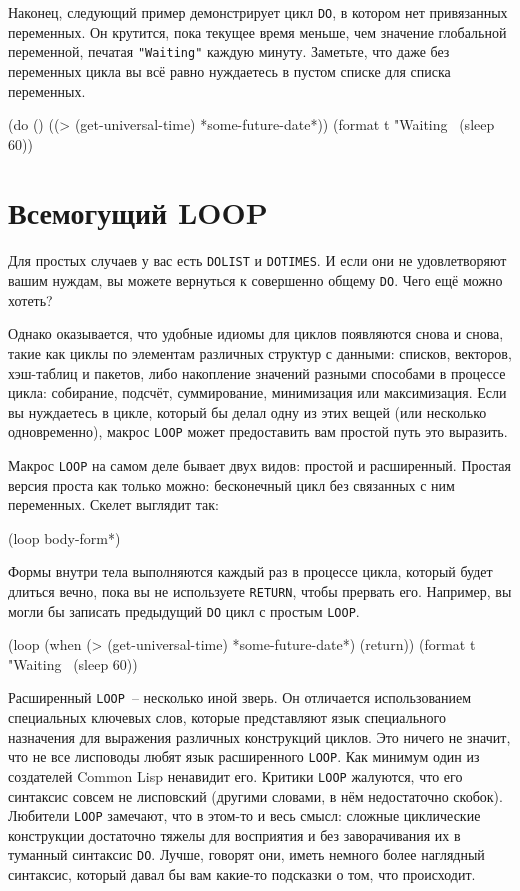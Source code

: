 Наконец, следующий пример демонстрирует цикл \lstinline{DO}, в котором нет привязанных
переменных. Он крутится, пока текущее время меньше, чем значение глобальной переменной,
печатая \lstinline{"Waiting"} каждую минуту. Заметьте, что даже без переменных цикла вы всё равно
нуждаетесь в пустом списке для списка переменных.

\begin{myverb}
(do ()
    ((> (get-universal-time) *some-future-date*))
  (format t "Waiting~%
  (sleep 60)) 
\end{myverb}

\section{Всемогущий LOOP}

Для простых случаев у вас есть \lstinline{DOLIST} и \lstinline{DOTIMES}. И если они не удовлетворяют
вашим нуждам, вы можете вернуться к совершенно общему \lstinline{DO}. Чего ещё можно хотеть?

Однако оказывается, что удобные идиомы для циклов появляются снова и снова, такие как
циклы по элементам различных структур с данными: списков, векторов, хэш-таблиц и пакетов,
либо накопление значений разными способами в процессе цикла: собирание, подсчёт,
суммирование, минимизация или максимизация. Если вы нуж\-дае\-тесь в цикле, который бы делал
одну из этих вещей (или несколько одновременно), макрос \lstinline{LOOP} может предоставить вам
простой путь это выразить.

Макрос \lstinline{LOOP} на самом деле бывает двух видов: простой и расширенный. Простая версия
проста как только можно: бесконечный цикл без связанных с ним переменных. Скелет выглядит
так:

\begin{myverb}
(loop
  body-form*)
\end{myverb}

Формы внутри тела выполняются каждый раз в процессе цикла, который будет длиться вечно,
пока вы не используете \lstinline{RETURN}, чтобы прервать его. Например, вы могли бы записать
предыдущий \lstinline{DO} цикл с простым \lstinline{LOOP}.

\begin{myverb}
(loop
  (when (> (get-universal-time) *some-future-date*)
    (return))
  (format t "Waiting~%
  (sleep 60))
\end{myverb}

Расширенный \lstinline{LOOP}~-- несколько иной зверь. Он отличается использованием спе\-циаль\-ных
ключевых слов, которые представляют язык специального назначения для выражения различных
конструкций циклов. Это ничего не значит, что не все лисповоды любят язык расширенного
\lstinline{LOOP}. Как минимум один из создателей Common Lisp ненавидит его. Критики
\lstinline{LOOP} жалуются, что его синтаксис совсем не лисповский (другими словами, в нём
недостаточно скобок). Любители \lstinline{LOOP} замечают, что в этом-то и весь смысл: сложные
циклические конструкции достаточно тяжелы для восприятия и без заворачивания их в туманный
синтаксис \lstinline{DO}. Лучше, говорят они, иметь немного более наглядный синтаксис, который
давал бы вам какие-то подсказки о том, что происходит.

